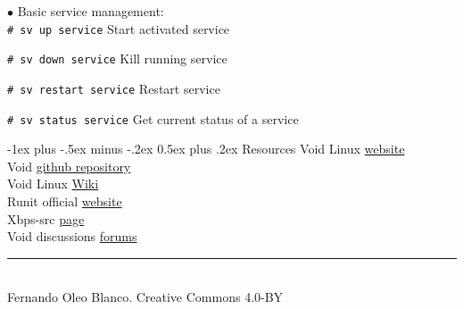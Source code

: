 \documentclass[12pt,landscape]{article}
\makeatletter
\renewcommand{\section}{\@startsection{section}{1}{0mm}%
                                {-1ex plus -.5ex minus -.2ex}%
                                {0.5ex plus .2ex}%
                                {\normalfont\large\bfseries}}
\def\cm#1#2{{\tt#1} \dotfill#2\par}
\makeatother
\begin{document}
\begin{multicols}{3}
$\bullet$ Basic service management: \\
	\cm{\# sv up service}{Start activated service}
	\cm{\# sv down service}{Kill running service}
	\cm{\# sv restart service}{Restart service}
	\cm{\# sv status service}{Get current status of a service}
	


\section{Resources}
Void Linux \href{https://www.voidlinux.eu}{website} \\
Void \href{https://github.com/voidlinux}{github repository} \\
Void Linux \href{https://wiki.voidlinux.eu/Main_Page}{Wiki} \\
Runit official \href{http://smarden.org/runit/}{website} \\
Xbps-src \href{https://github.com/voidlinux/void-packages}{page} \\
Void discussions \href{https://forum.voidlinux.eu/}{forums}

\vfill
\hrule
~\\
Fernando Oleo Blanco. Creative Commons 4.0-BY
\end{multicols}
\end{document}
